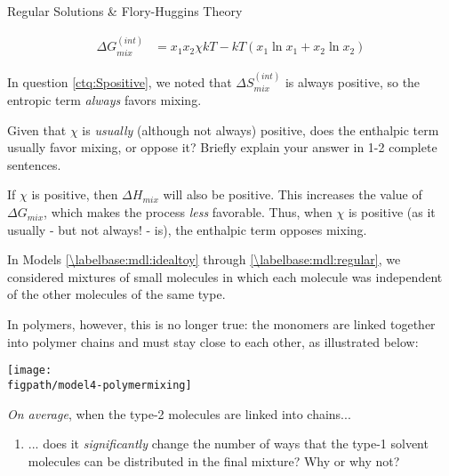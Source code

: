 \begin{activity}{Regular Solutions \& Flory-Huggins Theory}
\begin{ctqs}
\begin{enumerate}
			\begin{solution}[1in]
				\begin{align*}
					\Delta G_{mix}^{(int)} &= x_1 x_2 \chi kT - kT(x_1 \ln x_1 + x_2 \ln x_2)
				\end{align*}
			\end{solution}
		\end{enumerate}
			
		\question In question \ref{ctq:Spositive}, we noted that $\Delta S_{mix}^{(int)}$ is always positive, so the entropic term \emph{always} favors mixing.
		
			Given that $\chi$ is \emph{usually} (although not always) positive, does the enthalpic term usually favor mixing, or oppose it?  Briefly explain your answer in 1-2 complete sentences.
			
			\begin{solution}[2in]
			
				If $\chi$ is positive, then $\Delta H_{mix}$ will also be positive.  This increases the value of $\Delta G_{mix}$, which makes the process \emph{less} favorable.    Thus, when $\chi$ is positive (as it usually - but not always! - is), the enthalpic term opposes mixing.
				
			\end{solution}
\end{ctqs}

\begin{model}
\label{\labelbase:mdl:floryhuggins}

In Models \ref{\labelbase:mdl:idealtoy} through \ref{\labelbase:mdl:regular}, we considered mixtures of small molecules in which each molecule  was independent of the other molecules of the same type.

In polymers, however, this is no longer true: the monomers are linked together into polymer chains and must stay close to each other, as illustrated below: 
	
	\centerline{\texttt{[image: \\figpath/model4-polymermixing]}}

\end{model}

\begin{ctqs}

	\question \emph{On average}, when the type-2 molecules are linked into chains...
	
		\begin{enumerate}
			\item ... does it \emph{significantly} change the number of ways that the type-1 solvent molecules can be distributed in the final mixture?  Why or why not?
				\label{\labelbase:ctq:FHtype1}
			

\end{enumerate}
\end{ctqs}
\end{activity}
